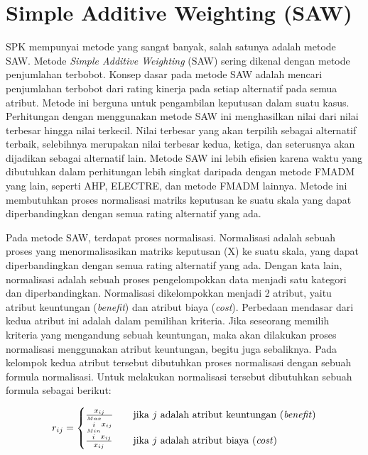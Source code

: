 \section{Simple Additive Weighting (SAW)}
\label{sec:saw}
SPK mempunyai metode yang sangat banyak, salah satunya adalah metode SAW. Metode \textit{Simple Additive Weighting} (SAW) sering dikenal dengan metode penjumlahan terbobot. Konsep dasar pada metode SAW adalah mencari penjumlahan terbobot dari rating kinerja pada setiap alternatif pada semua atribut. Metode ini berguna untuk pengambilan keputusan dalam suatu kasus. Perhitungan dengan menggunakan metode SAW ini menghasilkan nilai dari nilai terbesar hingga nilai terkecil. Nilai terbesar yang akan terpilih sebagai alternatif terbaik, selebihnya merupakan nilai terbesar kedua, ketiga, dan seterusnya akan dijadikan sebagai alternatif lain. Metode SAW ini lebih efisien karena waktu yang dibutuhkan dalam perhitungan lebih singkat daripada dengan metode FMADM yang lain, seperti AHP, ELECTRE, dan metode FMADM lainnya. Metode ini membutuhkan proses normalisasi matriks keputusan ke suatu skala yang dapat diperbandingkan dengan semua rating alternatif yang ada. %

Pada metode SAW, terdapat proses normalisasi. Normalisasi adalah sebuah proses yang menormalisasikan matriks keputusan (X) ke suatu skala, yang dapat diperbandingkan dengan semua rating alternatif yang ada. Dengan kata lain, normalisasi adalah sebuah proses pengelompokkan data menjadi satu kategori dan diperbandingkan. Normalisasi dikelompokkan menjadi 2 atribut, yaitu atribut keuntungan (\textit{benefit}) dan atribut biaya (\textit{cost}). Perbedaan mendasar dari kedua atribut ini adalah dalam pemilihan kriteria. Jika seseorang memilih kriteria yang mengandung sebuah keuntungan, maka akan dilakukan proses normalisasi menggunakan atribut keuntungan, begitu juga sebaliknya. Pada kelompok kedua atribut tersebut dibutuhkan proses normalisasi dengan sebuah formula normalisasi.  Untuk melakukan normalisasi tersebut dibutuhkan sebuah formula sebagai berikut:

\[ r_{ij}  =
  \begin{cases}
    \frac{x_{ij}}{\stackrel{Max}{i} x_{ij}}      & \quad \text{jika } j \text{ adalah atribut keuntungan (\textit{benefit})}\\
		
		
  \frac{\stackrel{Min}{i} x_{ij}} {x_{ij}}     & \quad \text{jika } j \text{ adalah atribut biaya (\textit{cost})}\\
  \end{cases}
\]

